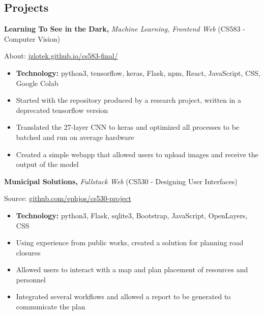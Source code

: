 \documentclass[10pt]{article}
\begin{document}
\vspace{-2em}
\subsection*{Projects}%
\label{sub:Projects}

\vspace{-0.5em}
\textbf{Learning To See in the Dark,}
\emph{Machine Learning, Frontend Web}
(CS583 - Computer Vision)

\indent \indent About:
\href{https://jzlotek.github.io/cs583-final/}
{jzlotek.github.io/cs583-final/}

\vspace{-\topsep}
\begin{itemize}
    \setlength\itemsep{-0.5em}
    \item \textbf{Technology:} python3, tensorflow, keras, Flask, npm,
        React, JavaScript, CSS, Google Colab
    \item Started with the repository produced by a research project,
        written in a deprecated tensorflow version
    \item Translated the 27-layer CNN to keras and optimized all processes
        to be batched and run on average hardware
    \item Created a simple webapp that allowed users to upload images and
        receive the output of the model
\end{itemize}

\vspace{-0.75em}
\textbf{Municipal Solutions,}
\emph{Fullstack Web}
(CS530 - Designing User Interfaces)

\indent \indent Source:
\href{https://github.com/ephjos/cs530-project}
{github.com/ephjos/cs530-project}

\vspace{-\topsep}
\begin{itemize}
    \setlength\itemsep{-0.5em}
    \item \textbf{Technology:} python3, Flask, sqlite3, Bootstrap,
        JavaScript, OpenLayers, CSS
    \item Using experience from public works, created a solution for
        planning road closures
    \item Allowed users to interact with a map and plan placement of
        resources and personnel
    \item Integrated several workflows and allowed a report to be generated
        to communicate the plan
\end{itemize}
\end{document}
